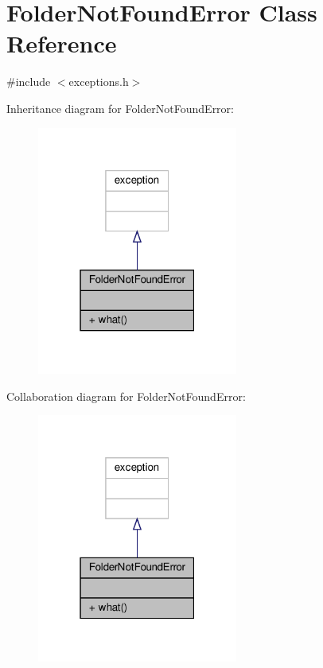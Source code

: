 \hypertarget{classFolderNotFoundError}{}\section{Folder\+Not\+Found\+Error Class Reference}
\label{classFolderNotFoundError}


{\ttfamily \#include $<$exceptions.\+h$>$}



Inheritance diagram for Folder\+Not\+Found\+Error\+:\nopagebreak
\begin{figure}[H]
\begin{center}
\leavevmode
\includegraphics[width=187pt]{classFolderNotFoundError__inherit__graph}
\end{center}
\end{figure}


Collaboration diagram for Folder\+Not\+Found\+Error\+:\nopagebreak
\begin{figure}[H]
\begin{center}
\leavevmode
\includegraphics[width=187pt]{classFolderNotFoundError__coll__graph}
\end{center}
\end{figure}
